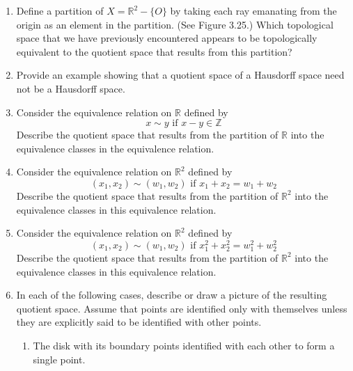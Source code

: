 \documentclass[12pt]{article}
\newcommand{\pn}{\textit{\textcolor{yellow}{PN: }}}
\newcommand{\pb}{\textit{\textcolor{orange}{PB: }}}
\begin{document}
\begin{enumerate}
		
	\item[\pn3.25] Define a partition of $X=\mathbb{R}^{2}-\{O\}$ by taking each ray emanating from the origin as an element in the partition. (See Figure 3.25.) Which topological space that we have previously encountered appears to be topologically equivalent to the quotient space that results from this partition?\\
	
	\item[\pb3.27] Provide an example showing that a quotient space of a Hausdorff space need not be a Hausdorff space.\\
	
	\item[3.28] Consider the equivalence relation on $\mathbb{R}$ defined by 
		\[x \sim y \text{ if } x-y \in \mathbb{Z}\]
	Describe the quotient space that results from the partition of $\mathbb{R}$ into the equivalence classes in the equivalence relation.\\
	
	\item[\pn3.29] Consider the equivalence relation on $\mathbb{R}^{2}$ defined by 
		\[\left(x_{1}, x_{2}\right) \sim\left(w_{1}, w_{2}\right) \text{ if } x_{1}+x_{2}=w_{1}+w_{2}\]
	 Describe the quotient space that results from the partition of $\mathbb{R}^{2}$ into the equivalence classes in this equivalence relation.\\
	
	\item[\pn3.30] Consider the equivalence relation on $\mathbb{R}^{2}$ defined by
	 	\[\left(x_{1}, x_{2}\right) \sim\left(w_{1}, w_{2}\right) \text{ if } x_{1}^{2}+x_{2}^{2}=w_{1}^{2}+w_{2}^{2}\] 
	 Describe the quotient space that results from the partition of $\mathbb{R}^{2}$ into the equivalence classes in this equivalence relation.\\
	
	\item[3.33] In each of the following cases, describe or draw a picture of the resulting quotient space. Assume that points are identified only with themselves unless they are explicitly said to be identified with other points.
	\begin{enumerate}
		\item[(a)]The disk with its boundary points identified with each other to form a single point.\\
		

\end{enumerate}
\end{enumerate}
\end{document}
